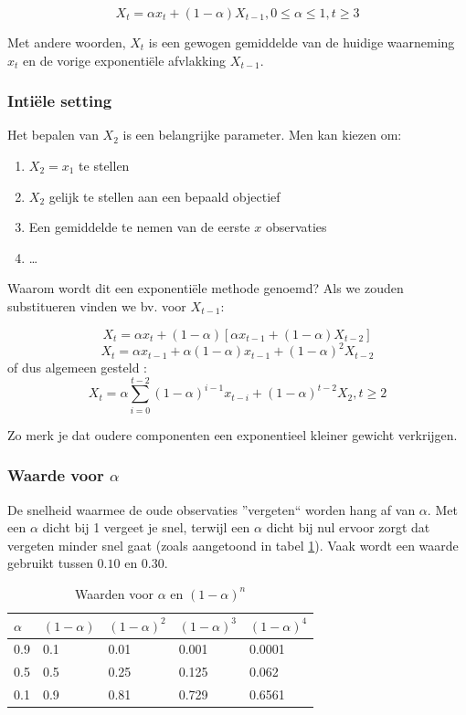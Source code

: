 \begin{definition}
\begin{equation}
	X_{t} = \alpha x_{t} + (1-\alpha)X_{t-1}, 0 \leq \alpha \leq 1, t \geq 3
\label{eq:singleExpSmooting}
\end{equation}
\end{definition}

Met andere woorden, $X_{t}$ is een gewogen gemiddelde van de huidige waarneming $x_t$ en de vorige exponentiële afvlakking $X_{t-1}$.

\subsubsection{Intiële setting}
Het bepalen van $X_{2}$ is een belangrijke parameter. Men kan kiezen om:
\begin{enumerate}
	\item $X_{2} = x_{1}$ te stellen
	\item $X_{2}$ gelijk te stellen aan een bepaald objectief
	\item Een gemiddelde te nemen van de eerste $x$ observaties
	\item \dots
\end{enumerate}

Waarom wordt dit een exponentiële methode genoemd? Als we zouden substitueren vinden we bv. voor $X_{t-1}$:

\[ X_{t} = \alpha x_{t} + (1-\alpha)\left[\alpha x_{t-1} + (1-\alpha)X_{t-2}\right] \] 
\[ X_{t} = \alpha x_{t-1} + \alpha (1-\alpha)x_{t-1} + (1-\alpha)^{2} X_{t-2} \]
of dus algemeen gesteld :
\[ X_{t} = \alpha \sum_{i=0}^{t-2}(1-\alpha)^{i-1}x_{t-i} + (1-\alpha)^{t-2} X_{2}, t \geq 2 \]

Zo merk je dat oudere componenten een exponentieel kleiner gewicht verkrijgen. 

\subsubsection{Waarde voor $\alpha$}
De snelheid waarmee de oude observaties ''vergeten`` worden hang af van $\alpha$. Met een $\alpha$ dicht bij 1 vergeet je snel, terwijl een $\alpha$ dicht bij nul ervoor zorgt dat vergeten minder snel gaat (zoals aangetoond in tabel \ref{tab:alpha}). Vaak wordt een waarde gebruikt tussen $0.10$ en $0.30$.

\begin{table}
\centering
    \begin{tabular}{l|llll}
    $\alpha$ & $(1-\alpha)$ & $(1-\alpha)^{2}$ & $(1-\alpha)^{3}$ & $(1-\alpha)^{4}$ \\ \hline
    0.9   & 0.1       & 0.01             & 0.001                      & 0.0001           \\
    0.5   & 0.5       & 0.25             & 0.125                      & 0.062            \\
    0.1   & 0.9       & 0.81             & 0.729                      & 0.6561           \\
    \end{tabular}
		\caption{Waarden voor $\alpha$ en $(1-\alpha)^{n}$}
		\label{tab:alpha}
\end{table}


